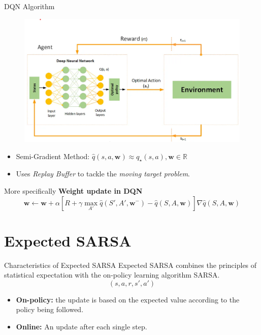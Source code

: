 \documentclass[serif]{beamer}  %
\begin{document}
\begin{frame}{DQN Algorithm}
    \begin{figure}
        \centering
        \includegraphics[width=\linewidth]{images/DQN_diagram.png}
    \end{figure}
    \begin{itemize}
        \item Semi-Gradient Method: $\hat{q}(s, a, \mathbf{w}) \approx q_{\star}(s, a), \mathbf{w} \in \mathbb{R}$ 
        \item Uses \textit{Replay Buffer} to tackle the \textit{moving target problem}.  
    \end{itemize}
\end{frame}

\begin{frame}{More specifically}
    \textbf{Weight update in DQN}
    $$
    \mathbf{w} \leftarrow \mathbf{w} + \alpha \left[ R + \gamma \max_{A'} \hat{q}(S', A', \mathbf{w}^{-}) - \hat{q}(S, A, \mathbf{w}) \right] \nabla \hat{q}(S, A, \mathbf{w})
    $$
\end{frame}

\section{Expected SARSA}

\begin{frame}{Characteristics of Expected SARSA}
    Expected SARSA combines the principles of statistical expectation with the on-policy learning algorithm SARSA.
    $$(s, a, r, s', a')$$
    \begin{itemize}
        \item \textbf{On-policy:} the update is based on the expected value according to the policy being followed.
        \vspace{0.5cm}
        \item \textbf{Online:} An update after each single step.
    \end{itemize}
\end{frame}
\end{document}
